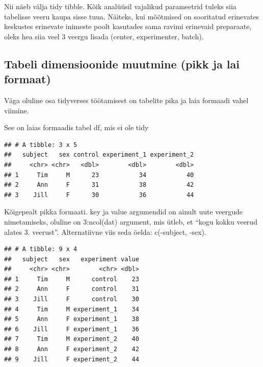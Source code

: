 \documentclass[]{book}
\newenvironment{Shaded}{\begin{snugshade}}{\end{snugshade}}
\newcommand{\KeywordTok}[1]{\textcolor[rgb]{0.13,0.29,0.53}{\textbf{#1}}}
\newcommand{\DataTypeTok}[1]{\textcolor[rgb]{0.13,0.29,0.53}{#1}}
\newcommand{\DecValTok}[1]{\textcolor[rgb]{0.00,0.00,0.81}{#1}}
\newcommand{\StringTok}[1]{\textcolor[rgb]{0.31,0.60,0.02}{#1}}
\newcommand{\CommentTok}[1]{\textcolor[rgb]{0.56,0.35,0.01}{\textit{#1}}}
\newcommand{\OperatorTok}[1]{\textcolor[rgb]{0.81,0.36,0.00}{\textbf{#1}}}
\newcommand{\NormalTok}[1]{#1}
\begin{document}
Nii näeb välja tidy tibble. Kõik analüüsil vajalikud parameetrid tuleks
siia tabelisse veeru kaupa sisse tuua. Näiteks, kui mõõtmised on
sooritatud erinevates keskustes erinevate inimeste poolt kasutades sama
ravimi erinevaid preparaate, oleks hea siia veel 3 veergu lisada
(center, experimenter, batch).

\subsection{Tabeli dimensioonide muutmine (pikk ja lai
formaat)}\label{tabeli-dimensioonide-muutmine-pikk-ja-lai-formaat}

Väga oluline osa tidyverses töötamisest on tabelite pika ja laia
formaadi vahel viimine.

See on laias formaadis tabel df, mis ei ole tidy

\begin{verbatim}
## # A tibble: 3 x 5
##   subject   sex control experiment_1 experiment_2
##     <chr> <chr>   <dbl>        <dbl>        <dbl>
## 1     Tim     M      23           34           40
## 2     Ann     F      31           38           42
## 3    Jill     F      30           36           44
\end{verbatim}

Kõigepealt pikka formaati. key ja value argumendid on ainult uute
veergude nimetamiseks, oluline on 3:ncol(dat) argument, mis ütleb, et
``kogu kokku veerud alates 3. veerust''. Alternatiivne viis seda öelda:
c(-subject, -sex).

\begin{Shaded}
\end{Shaded}

\begin{verbatim}
## # A tibble: 9 x 4
##   subject   sex   experiment value
##     <chr> <chr>        <chr> <dbl>
## 1     Tim     M      control    23
## 2     Ann     F      control    31
## 3    Jill     F      control    30
## 4     Tim     M experiment_1    34
## 5     Ann     F experiment_1    38
## 6    Jill     F experiment_1    36
## 7     Tim     M experiment_2    40
## 8     Ann     F experiment_2    42
## 9    Jill     F experiment_2    44
\end{verbatim}
\end{document}
